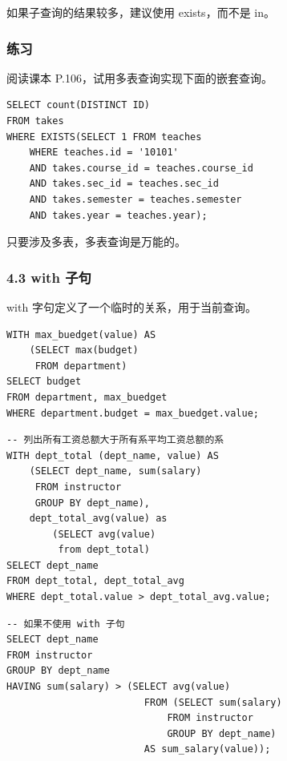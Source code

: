 \documentclass[aspectratio=169, 14pt]{beamer}
\begin{document}
{
\begin{frame}[standout]
  如果子查询的结果较多，建议使用 exists，而不是 in。
\end{frame}
}

\begin{frame}[fragile]
    \frametitle{练习}
阅读课本 P.106，试用多表查询实现下面的嵌套查询。

\begin{verbatim}
SELECT count(DISTINCT ID)
FROM takes
WHERE EXISTS(SELECT 1 FROM teaches
    WHERE teaches.id = '10101'
    AND takes.course_id = teaches.course_id
    AND takes.sec_id = teaches.sec_id
    AND takes.semester = teaches.semester
    AND takes.year = teaches.year);
    \end{verbatim}

\end{frame}

{
\begin{frame}[standout]
只要涉及多表，多表查询是万能的。
\end{frame}
}

\begin{frame}[fragile]
    \frametitle{4.3 with 子句}

\alert{with} 字句定义了一个临时的关系，用于当前查询。    

\begin{verbatim}
WITH max_buedget(value) AS
    (SELECT max(budget)
     FROM department)
SELECT budget
FROM department, max_buedget
WHERE department.budget = max_buedget.value;
\end{verbatim}
\end{frame}

\begin{frame}[fragile]

\begin{verbatim}
-- 列出所有工资总额大于所有系平均工资总额的系
WITH dept_total (dept_name, value) AS
    (SELECT dept_name, sum(salary)
     FROM instructor
     GROUP BY dept_name),
    dept_total_avg(value) as
        (SELECT avg(value)
         from dept_total)
SELECT dept_name
FROM dept_total, dept_total_avg
WHERE dept_total.value > dept_total_avg.value;
\end{verbatim}

\end{frame}

\begin{frame}[fragile]
    \begin{verbatim}
-- 如果不使用 with 子句
SELECT dept_name
FROM instructor
GROUP BY dept_name
HAVING sum(salary) > (SELECT avg(value)
                        FROM (SELECT sum(salary)
                            FROM instructor
                            GROUP BY dept_name)
                        AS sum_salary(value));
                        \end{verbatim}
\end{frame}
\end{document}
